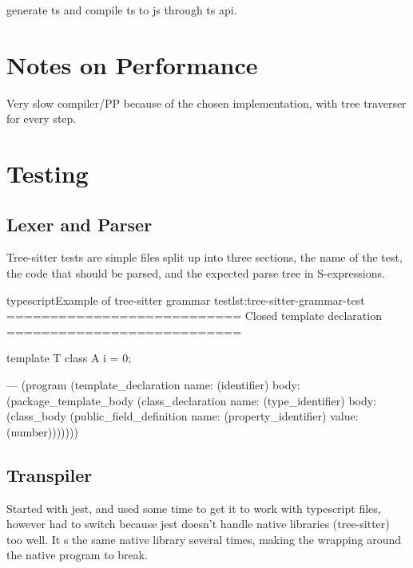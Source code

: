generate ts and compile ts to js through ts api.

\section{Notes on Performance}\label{sec:notes-on-performance}

Very slow compiler/PP because of the chosen implementation, with tree traverser for every step.


\section{Testing}\label{sec:testing}

\subsection{Lexer and Parser}\label{subsec:testing-lexer-and-parser}

Tree-sitter tests are simple  files split up into three sections, the name of the test, the code that should be parsed, and the expected parse tree in S-expressions\cite{sexprs}.

\begin{code}{typescript}{Example of tree-sitter grammar test}{lst:tree-sitter-grammar-test}
    ===========================
    Closed template declaration
    ===========================

    template T {
        class A {
            i = 0;
        }
    }

    ---
    (program
        (template_declaration
            name: (identifier)
            body: (package_template_body
                    (class_declaration
                        name: (type_identifier)
                        body: (class_body
                            (public_field_definition
                                name: (property_identifier)
                                value: (number)))))))

\end{code}

\subsection{Transpiler}\label{subsec:testing-transpiler}

Started with jest, and used some time to get it to work with typescript files, however had to switch because jest doesn't handle native libraries (tree-sitter) too well.
It s the same native library several times, making the wrapping around the native program to break.